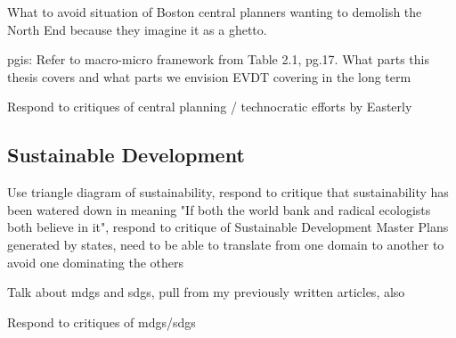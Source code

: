 What to avoid situation of Boston central planners wanting to demolish the North End because they imagine it as a ghetto. \cite{jacobsDeathLifeGreat2016}

\ac{pgis}: Refer to macro-micro framework from Table 2.1, pg.17. What parts this thesis covers and what parts we envision EVDT covering in the long term \cite{jankowskiGISGroupDecision2001}

Respond to critiques of central planning / technocratic efforts by Easterly \cite{easterly2015}

\subsection{Sustainable Development}

Use triangle diagram of sustainability, respond to critique that sustainability has been watered down in meaning "If both the world bank and radical ecologists both believe in it", respond to critique of Sustainable Development Master Plans generated by states, need to be able to translate from one domain to another to avoid one dominating the others \cite{campbellGreenCitiesGrowing2016}

Talk about \acp{mdg} and \acp{sdg}, pull from my previously written articles, also \cite{unitednationsWhoWillBe2013}

Respond to critiques of \acp{mdg}/\acp{sdg} \cite{alstonShipsPassingNight2005, reddyGlobalDevelopmentGoals2008}






%
%
%
